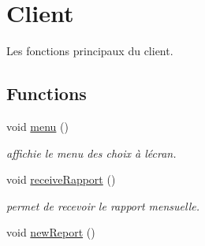 \hypertarget{group__main}{}\section{Client}
\label{group__main}


Les fonctions principaux du client.  


\subsection*{Functions}
\begin{DoxyCompactItemize}
\item 
\hypertarget{group__main_ga2a0e843767aeea4f433a28b9c54f573a}{}void \hyperlink{group__main_ga2a0e843767aeea4f433a28b9c54f573a}{menu} ()\label{group__main_ga2a0e843767aeea4f433a28b9c54f573a}

\begin{DoxyCompactList}\small\item\em affichie le menu des choix à l\textquotesingle{}écran. \end{DoxyCompactList}\item 
\hypertarget{group__main_gacc28d96d3dde01fd0b1290d67ed5c521}{}void \hyperlink{group__main_gacc28d96d3dde01fd0b1290d67ed5c521}{receive\+Rapport} ()\label{group__main_gacc28d96d3dde01fd0b1290d67ed5c521}

\begin{DoxyCompactList}\small\item\em permet de recevoir le rapport mensuelle. \end{DoxyCompactList}\item 
\hypertarget{group__main_gaa404f7b3293c0f454e9afdd108c7b35e}{}void \hyperlink{group__main_gaa404f7b3293c0f454e9afdd108c7b35e}{new\+Report} ()\label{group__main_gaa404f7b3293c0f454e9afdd108c7b35e}


\end{DoxyCompactItemize}
